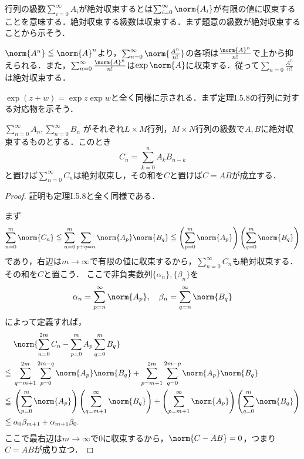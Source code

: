 行列の級数$\sum_{i=0}^\infty A_i$が絶対収束するとは$\sum_{i=0}^\infty \norm{A_i}$が有限の値に収束することを意味する．絶対収束する級数は収束する．まず題意の級数が絶対収束することから示そう．

\begin{tproof}
    $\norm{A^n} \leq \norm{A}^n$より，$\sum_{n = 0}^\infty \norm{\frac{A^n}{n!}}$の各項は$\frac{\norm{A}^n}{n!}$で上から抑えられる．また，$\sum_{n=0}^\infty \frac{\norm{A}^n}{n!}$は$\exp \norm{A}$に収束する．従って$\sum_{n = 0} \frac{A^n}{n!}$は絶対収束する．
\end{tproof}

$\exp(z + w) = \exp z \exp w$と全く同様に示される．まず定理I.5.8の行列に対する対応物を示そう．

\begin{lemma}{}{}
    $\sum_{n=0}^\infty A_n, \sum_{n=0}^\infty B_n$ がそれぞれ$L \times M$行列，$M \times N$行列の級数で$A, B$に絶対収束するものとする．このとき
    \[
        C_n = \sum_{k=0}^n A_kB_{n-k}
    \]
    と置けば$\sum_{n=0}^\infty C_n$は絶対収束し，その和を$C$と置けば$C = AB$が成立する．
\end{lemma}

\begin{proof}
    証明も定理I.5.8と全く同様である．

    まず
    \[
        \sum_{n = 0}^m\norm{C_n} \leq \sum_{n = 0}^m\sum_{p + q = n}\norm{A_p}\norm{B_q} \leq \left(\sum_{p=0}^m \norm{A_p}\right) \left(\sum_{q=0}^m \norm{B_q}\right)
    \]
    であり，右辺は$m \to \infty$で有限の値に収束するから，$\sum_{n=0}^\infty C_n$も絶対収束する．その和を$C$と置こう．
    ここで非負実数列$\{\alpha_n\}, \{\beta_n\}$を
    \[
        \alpha_n = \sum_{p = n}^\infty \norm{A_p},\quad \beta_n = \sum_{q = n}^\infty \norm{B_q}
    \]
    によって定義すれば，
    \begin{align*}
               & \norm{\sum_{n=0}^{2m} C_n - \sum_{p = 0}^m A_p \sum_{q = 0}^m B_q}                                                                                                  \\
        \leq{} & \sum_{q = m + 1}^{2m} \sum_{p = 0}^{2m - q} \norm{A_p}\norm{B_q} + \sum_{p = m+1}^{2m}\sum_{q = 0}^{2m - p} \norm{A_p}\norm{B_q}                                    \\
        \leq{} & \left(\sum_{p=0}^m \norm{A_p}\right) \left(\sum_{q=m+1}^\infty \norm{B_q}\right) + \left(\sum_{p=m+1}^\infty \norm{A_p}\right) \left(\sum_{q=0}^m \norm{B_q}\right) \\
        \leq{} & \alpha_0\beta_{m+1} + \alpha_{m+1}\beta_0.
    \end{align*}
    ここで最右辺は$m \to \infty$で$0$に収束するから，$\norm{C - AB} = 0$，つまり$C = AB$が成り立つ．
\end{proof}

